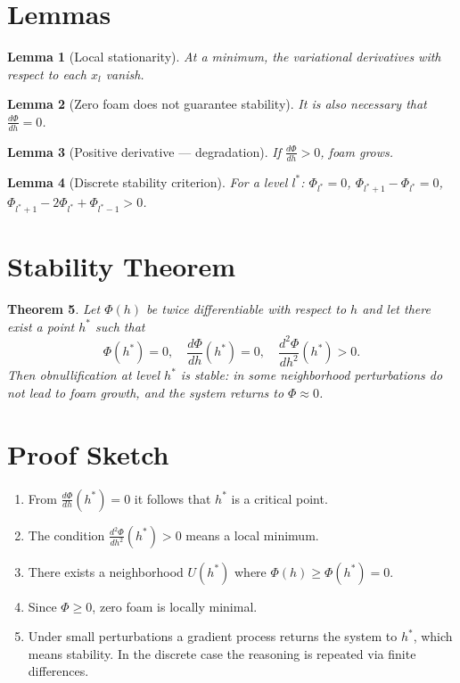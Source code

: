 \documentclass[11pt,a4paper]{article}
\newtheorem{theorem}{Theorem}
\newtheorem{lemma}[theorem]{Lemma}
\begin{document}
\section{Lemmas}

\begin{lemma}[Local stationarity]
At a minimum, the variational derivatives with respect to each $x_l$ vanish.
\end{lemma}

\begin{lemma}[Zero foam does not guarantee stability]
It is also necessary that $\frac{d\Phi}{dh} = 0$.
\end{lemma}

\begin{lemma}[Positive derivative --- degradation]
If $\frac{d\Phi}{dh} > 0$, foam grows.
\end{lemma}

\begin{lemma}[Discrete stability criterion]
For a level $l^*$: $\Phi_{l^*} = 0$, $\Phi_{l^*+1} - \Phi_{l^*} = 0$, $\Phi_{l^*+1} - 2\Phi_{l^*} + \Phi_{l^*-1} > 0$.
\end{lemma}

\section{Stability Theorem}

\begin{theorem}
Let $\Phi(h)$ be twice differentiable with respect to $h$ and let there exist a point $h^*$ such that
\begin{equation}
\Phi(h^*) = 0, \quad \frac{d\Phi}{dh}(h^*) = 0, \quad \frac{d^2\Phi}{dh^2}(h^*) > 0.
\label{eq:stability-conditions}
\end{equation}
Then obnullification at level $h^*$ is stable: in some neighborhood perturbations do not lead to foam growth, and the system returns to $\Phi \approx 0$.
\end{theorem}

\section{Proof Sketch}

\begin{enumerate}
    \item From $\frac{d\Phi}{dh}(h^*) = 0$ it follows that $h^*$ is a critical point.
    \item The condition $\frac{d^2\Phi}{dh^2}(h^*) > 0$ means a local minimum.
    \item There exists a neighborhood $U(h^*)$ where $\Phi(h) \geq \Phi(h^*) = 0$.
    \item Since $\Phi \geq 0$, zero foam is locally minimal.
    \item Under small perturbations a gradient process returns the system to $h^*$, which means stability. In the discrete case the reasoning is repeated via finite differences.
\end{enumerate}
\end{document}
